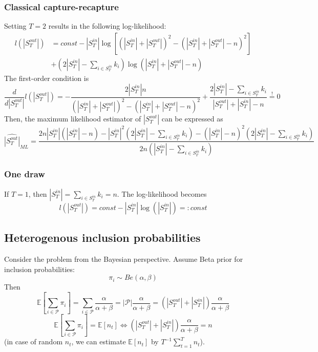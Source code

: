 \documentclass[a4paper, 12pt]{article}
\newcommand{\sout}{|S^{out}_T|}
\newcommand{\sint}{|S^{in}_T|}
\begin{document}
\subsubsection{Classical capture-recapture}
Setting $T = 2$ results in the following log-likelihood:
\begin{align*}
l(\sout) &= const - \sint \log[(\sint + \sout)^{2} - (\sint + \sout - n)^2] \\ 
&+ (2\sint - \sum_{i \in S_T^{in}} k_i) \log (\sint + \sout - n)
\end{align*}
The first-order condition is
\begin{equation*}
\frac{d}{d\sout}l(\sout) = -\frac{2\sint n}{(\sint + \sout)^{2} - (\sint + \sout - n)^2} + \frac{2\sint - \sum_{i \in S_T^{in}} k_i}{\sout + \sint - n} \overset{!}{=} 0
\end{equation*}
Then, the maximum likelihood estimator of $\sout$ can be expressed as
\begin{equation}
\widehat{\sout}_{ML} = \frac{2n\sint (\sint - n) - \sint^2 (2\sint - \sum_{i \in S_T^{in}} k_i) - (\sint - n)^2 (2\sint - \sum_{i \in S_T^{in}} k_i)}{2n(\sint - \sum_{i \in S_T^{in}} k_i)}
\end{equation}
\subsubsection{One draw}
If $T = 1$, then $\sint = \sum_{i \in S_T^{in}} k_i = n$. The log-likelihood becomes
\begin{equation*}
l(\sout) = const - \sint \log(\sint) =: const
\end{equation*}
\subsection{Heterogenous inclusion probabilities}
Consider the problem from the Bayesian perspective. Assume Beta prior for inclusion probabilities:
\begin{equation*}
    \pi_i \sim Be(\alpha, \beta)
\end{equation*}
Then
\begin{equation*}
    \mathbb{E}[\sum_{i \in \mathcal{P}} \pi_i] = \sum_{i \in \mathcal{P}} \frac{\alpha}{\alpha + \beta} = |\mathcal{P}| \frac{\alpha}{\alpha + \beta} = (|S_T^{out}| + |S_T^{in}|) \frac{\alpha}{\alpha + \beta}
\end{equation*}
\begin{equation} \label{eq:2}
    \mathbb{E}[\sum_{i \in \mathcal{P}} \pi_i] = \mathbb{E}[n_t]
    \Leftrightarrow (|S_T^{out}| + |S_T^{in}|) \frac{\alpha}{\alpha + \beta} = n
\end{equation}
(in case of random $n_t$, we can estimate $\mathbb{E}[n_t]$ by $T^{-1} \sum_{t=1}^T n_t$).
\end{document}
